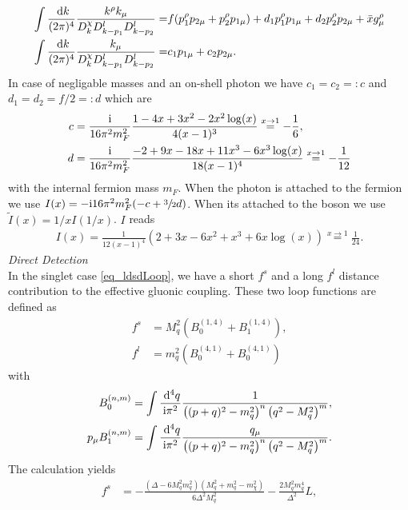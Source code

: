\begin{appendix}
\begin{align}
\begin{aligned}
 \int\frac{\; \mathrm{d} k}{(2\pi)^4}\frac{ k^\rho k_\mu}{D^\chi_kD^l_{k-p_1}D^l_{k-p_2}} =&  f (p_1^\rho p_{2\mu} + p_2^\rho p_{1\mu}) +  d_1p_1^\rho p_{1\mu} +  d_2p_2^\rho p_{2\mu} + \bar x g^\rho_\mu\\
 \int\frac{\; \mathrm{d} k}{(2\pi)^4}\frac{k_\mu}{D^\chi_kD^l_{k-p_1}D^l_{k-p_2}} =&  c_1 p_{1\mu} +  c_2 p_{2\mu}.
 \end{aligned}
 \label{eq_g2loops}
\end{align}
In case of negligable masses and an on-shell photon we have $c_1=c_2=:c$ and $d_1=d_2=f/2=:d$ which are \cite{Lavoura}
\begin{align}
 c &= \frac{\text{i}}{16\pi^2m_F^2} \frac{1-4x+3x^2-2x^2\log(x)}{4(x-1)^3}\stackrel{x\rightarrow 1}{=} -\frac16,\\
 d &= \frac{\text{i}}{16\pi^2m_F^2} \frac{-2+9x-18x+11x^3 - 6x^3\log(x)}{18(x-1)^4} \stackrel{x\rightarrow 1}{=} -\frac{1}{12}
 \label{eq_loopscd}
\end{align}
with the internal fermion mass $m_F$. When the photon is attached to the fermion we use $I(x) = -\text{i} 16\pi^2m^2_F(-c+\sfrac32 d)$. 
When its attached to the boson we use $\tilde{I}(x)=1/xI(1/x)$. $I$ reads
\begin{align}
 I(x) = \frac{1}{12(x-1)^4}\left(2+3x-6x^2+x^3+6x\log(x) \right) \stackrel{x\rightarrow1}{=} \frac{1}{24}.
 \label{eq_loopmuon}
\end{align}
\textit{Direct Detection}\\
\noindent In the singlet case \eqref{eq_ldsdLoop}, we have a short $f^s$ and a long $f^l$ distance contribution to the effective gluonic coupling. These two loop functions
are defined as \cite{1007.2601}
\begin{align}
 f^s &= M_q^2(B_0^{(1,4)} + B_1^{(1,4)}),\\
 f^l &= m_q^2(B_0^{(4,1)} + B_0^{(4,1)})
 \label{eq_singletloop}
\end{align}
with
\begin{align}
 B_0^{(n,m)} &= \int \frac{\; \mathrm{d}^4 q}{\text{i} \pi^2}\frac{1}{\left((p+q)^2-m_q^2\right)^n\left(q^2-M^2_q\right)^m},\\
 p_\mu B_1^{(n,m)} &= \int \frac{\; \mathrm{d}^4 q}{\text{i} \pi^2}\frac{q_\mu}{\left((p+q)^2-m_q^2\right)^n\left(q^2-M^2_q\right)^m}.
\end{align}
The calculation yields
\begin{align}
 f^s &=-\frac{(\Delta-6M_q^2m_q^2)(M_q^2+m_q^2-m_\chi^2)}{6\Delta^2M_q^2} - \frac{2M_q^2m_q^4}{\Delta^2}L,\\

\end{align}
\end{appendix}
